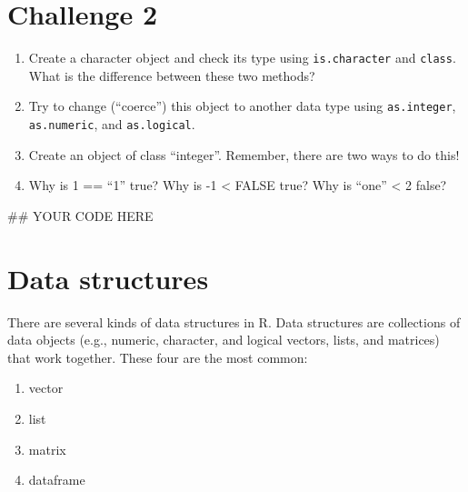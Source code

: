 \documentclass[]{article}
\newenvironment{Shaded}{\begin{snugshade}}{\end{snugshade}}
\newcommand{\NormalTok}[1]{#1}
\providecommand{\tightlist}{%
  \setlength{\itemsep}{0pt}\setlength{\parskip}{0pt}}
\begin{document}
\section{\texorpdfstring{\textbf{Challenge
2}}{Challenge 2}}\label{challenge-2}

\begin{enumerate}
\def\labelenumi{\arabic{enumi}.}
\tightlist
\item
  Create a character object and check its type using
  \texttt{is.character} and \texttt{class}. What is the difference
  between these two methods?\\
\item
  Try to change (``coerce'') this object to another data type using
  \texttt{as.integer}, \texttt{as.numeric}, and \texttt{as.logical}.\\
\item
  Create an object of class ``integer''. Remember, there are two ways to
  do this!\\
\item
  Why is 1 == ``1'' true? Why is -1 \textless{} FALSE true? Why is
  ``one'' \textless{} 2 false?
\end{enumerate}

\begin{Shaded}
\begin{Highlighting}[]
\NormalTok{## YOUR CODE HERE}
\end{Highlighting}
\end{Shaded}

\section{Data structures}\label{data-structures}

There are several kinds of data structures in R. Data structures are
collections of data objects (e.g., numeric, character, and logical
vectors, lists, and matrices) that work together. These four are the
most common:

\begin{enumerate}
\def\labelenumi{\arabic{enumi}.}
\tightlist
\item
  vector\\
\item
  list\\
\item
  matrix\\
\item
  dataframe
\end{enumerate}
\end{document}
